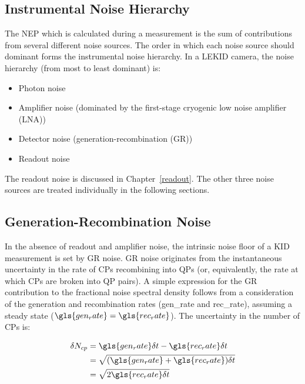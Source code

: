 \subsection{Instrumental Noise Hierarchy}

The NEP which is calculated during a measurement is the sum of contributions from several different noise sources. The order in which each noise source should dominant forms the instrumental noise hierarchy. In a LEKID camera, the noise hierarchy (from most to least dominant) is:

\begin{itemize}[nosep]
  \item Photon noise
  \item Amplifier noise (dominated by the first-stage cryogenic low noise amplifier (LNA))
  \item Detector noise (generation-recombination (GR))
  \item Readout noise
\end{itemize}

The readout noise is discussed in Chapter~\ref{readout}. The other three noise sources are treated individually in the following sections.

\subsection{Generation-Recombination Noise}\label{ssec:GR noise}

In the absence of readout and amplifier noise, the intrinsic noise floor of a KID measurement is set by GR noise. GR noise originates from the instantaneous uncertainty in the rate of CPs recombining into QPs (or, equivalently, the rate at which CPs are broken into QP pairs). A simple expression for the GR contribution to the fractional noise spectral density follows from a consideration of the generation and recombination rates (\gls{gen_rate} and \gls{rec_rate}), assuming a steady state ($\gls{gen_rate} = \gls{rec_rate}$). The uncertainty in the number of CPs is:

\begin{equation}\label{eq:dNcp1}
  \begin{aligned}
  \delta N_{cp} &= \gls{gen_rate}\delta t - \gls{rec_rate}\delta t \\
                &= \sqrt{(\gls{gen_rate} + \gls{rec_rate})\delta t} \\
                &= \sqrt{2\gls{rec_rate}\delta t}
  \end{aligned}
\end{equation}

